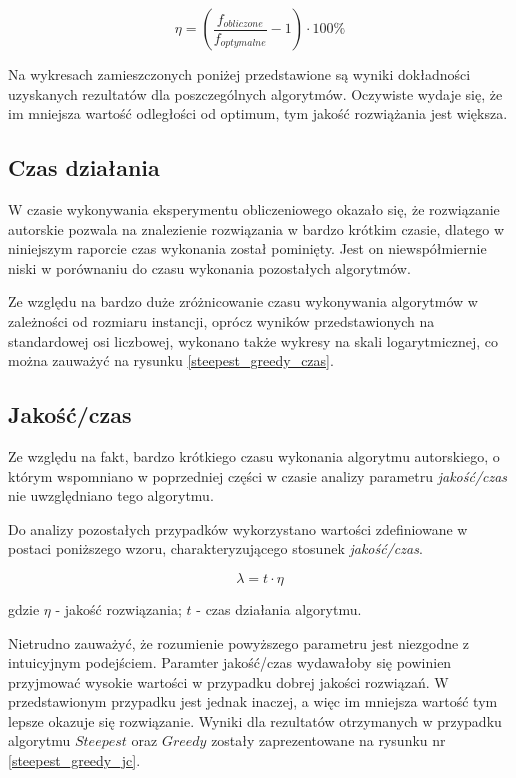 $$
\eta =
\left (\frac{f_{obliczone}}{f_{optymalne}} - 1\right )\cdot 100 \%
$$

Na wykresach zamieszczonych poniżej przedstawione są wyniki dokładności
uzyskanych rezultatów dla poszczególnych algorytmów. Oczywiste wydaje się,
że im mniejsza wartość odległości od optimum, tym jakość rozwiążania
jest większa.



\subsection{Czas działania}

W czasie wykonywania eksperymentu obliczeniowego okazało się, że
rozwiązanie autorskie pozwala na znalezienie rozwiązania w bardzo
krótkim czasie, dlatego w niniejszym raporcie czas wykonania
został pominięty. Jest on niewspółmiernie niski w porównaniu do
czasu wykonania pozostałych algorytmów.

Ze względu na bardzo duże zróżnicowanie czasu wykonywania algorytmów
w zależności od rozmiaru instancji, oprócz wyników przedstawionych
na standardowej osi liczbowej, wykonano także wykresy na skali
logarytmicznej, co można zauważyć na rysunku \ref{steepest_greedy_czas}.

\subsection{Jakość/czas}

Ze względu na fakt, bardzo krótkiego czasu wykonania algorytmu
autorskiego, o którym wspomniano w poprzedniej części w czasie analizy
parametru \emph{jakość/czas} nie uwzględniano tego algorytmu.

Do analizy pozostałych przypadków wykorzystano wartości zdefiniowane
w postaci poniższego wzoru, charakteryzującego stosunek \emph{jakość/czas}.

$$
	\lambda = t \cdot \eta
$$

gdzie $\eta$ - jakość rozwiązania; $t$ - czas działania algorytmu.

Nietrudno zauważyć, że rozumienie powyższego parametru jest niezgodne
z intuicyjnym podejściem. Paramter jakość/czas wydawałoby się powinien
przyjmować wysokie wartości w przypadku dobrej jakości rozwiązań. W
przedstawionym przypadku jest jednak inaczej, a więc im mniejsza
wartość tym lepsze okazuje się rozwiązanie. Wyniki
dla rezultatów otrzymanych w przypadku algorytmu $Steepest$ oraz
$Greedy$ zostały zaprezentowane na rysunku nr \ref{steepest_greedy_jc}.

